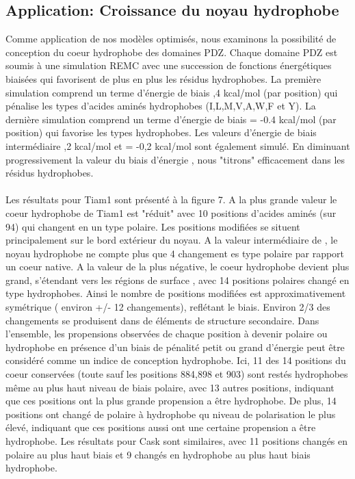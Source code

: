 \begin{enumarete}
\begin{enumerate}
\section{Application: Croissance du noyau hydrophobe}
Comme application de nos modèles optimisés, nous examinons la possibilité de conception du coeur hydrophobe des domaines PDZ. Chaque domaine PDZ est soumis à une simulation REMC avec une succession de fonctions énergétiques biaisées qui favorisent de plus en plus les résidus hydrophobes. La première simulation comprend un terme d'énergie de biais ,4 kcal/mol (par position) qui pénalise les types d'acides aminés hydrophobes (I,L,M,V,A,W,F et Y). La dernière simulation comprend un terme d'énergie de biais \delta = -0.4 kcal/mol (par position) qui favorise les types hydrophobes. Les valeurs d'énergie de biais intermédiaire ,2 kcal/mol et \delta = -0,2 kcal/mol sont également simulé. En diminuant progressivement la valeur du biais d'énergie \delta, nous "titrons" efficacement dans les résidus hydrophobes.
\paragraph{}
Les résultats pour Tiam1 sont présenté à la figure 7. A la plus grande valeur \delta le coeur hydrophobe de Tiam1 est "réduit" avec 10 positions d'acides aminés (sur 94) qui changent en un type polaire. Les positions modifiées se situent principalement sur le bord extérieur du noyau. A la valeur intermédiaire de \delta, le noyau hydrophobe ne compte plus que 4 changement es type polaire par rapport un coeur native. A la valeur de \delta la plus négative, le coeur hydrophobe devient plus grand, s'étendant vers les régions de surface , avec 14 positions polaires changé en type hydrophobes. Ainsi le nombre de positions modifiées est approximativement symétrique ( environ +/- 12 changements), reflétant le biais. Environ 2/3 des changements se produisent dans de éléments de structure secondaire. Dans l'ensemble, les propensions observées de chaque position à devenir polaire ou hydrophobe en présence d'un biais de pénalité petit ou grand d'énergie \delta peut être considéré comme un indice de conception hydrophobe. Ici, 11 des 14 positions du coeur conservées (toute sauf les positions 884,898 et 903) sont restés hydrophobes même au plus haut niveau de biais polaire, avec 13 autres positions, indiquant que ces positions ont la plus grande propension a être hydrophobe. De plus, 14 positions ont changé de polaire à hydrophobe qu niveau de polarisation le plus élevé, indiquant que ces positions aussi ont une certaine propension a être hydrophobe. Les résultats pour Cask sont similaires, avec 11 positions changés en polaire au plus haut biais et 9 changés en hydrophobe au plus haut biais  hydrophobe.

\end{enumerate}
\end{enumarete}
